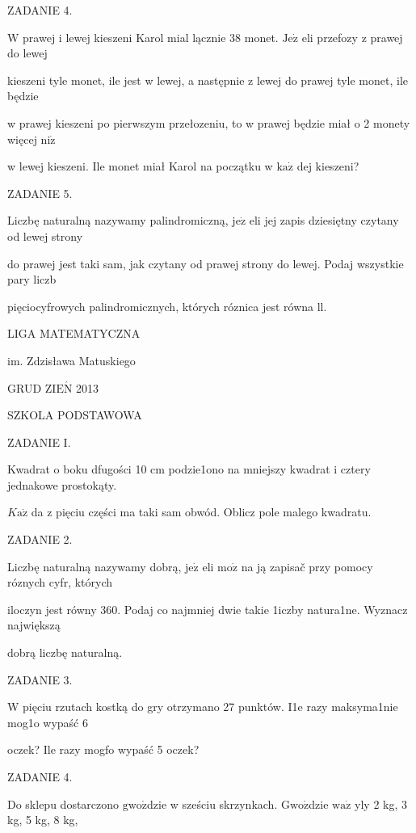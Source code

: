 \documentclass[a4paper,12pt]{article}
\begin{document}
ZADANIE 4.

$\mathrm{W}$ prawej i lewej kieszeni Karol mial lącznie 38 monet. $\mathrm{J}\mathrm{e}\dot{\mathrm{z}}$ eli przefozy z prawej do lewej

kieszeni tyle monet, ile jest w lewej, a następnie z lewej do prawej tyle monet, ile będzie

w prawej kieszeni po pierwszym przełozeniu, to w prawej będzie miał o 2 monety więcej $\mathrm{n}\mathrm{i}\dot{\mathrm{z}}$

w lewej kieszeni. Ile monet miał Karol na początku w $\mathrm{k}\mathrm{a}\dot{\mathrm{z}}$ dej kieszeni?

ZADANIE 5.

Liczbę naturalną nazywamy palindromiczną, $\mathrm{j}\mathrm{e}\dot{\mathrm{z}}$ eli jej zapis dziesiętny czytany od lewej strony

do prawej jest taki sam, jak czytany od prawej strony do lewej. Podaj wszystkie pary liczb

pięciocyfrowych palindromicznych, których róznica jest równa ll.






LIGA MATEMATYCZNA

im. Zdzisława Matuskiego

GRUD Z$\mathrm{I}\mathrm{E}\acute{\mathrm{N}}$ 2013

SZKOLA PODSTAWOWA

ZADANIE I.

Kwadrat o boku dfugości 10 cm podzie1ono na mniejszy kwadrat i cztery jednakowe prostokąty.

$K\mathrm{a}\dot{\mathrm{z}}$ da z pięciu części ma taki sam obwód. Oblicz pole malego kwadratu.

ZADANIE 2.

Liczbę naturalną nazywamy dobrą, $\mathrm{j}\mathrm{e}\dot{\mathrm{z}}$ eli $\mathrm{m}\mathrm{o}\dot{\mathrm{z}}$ na ją zapisač przy pomocy róznych cyfr, których

iloczyn jest równy 360. Podaj co najmniej dwie takie 1iczby natura1ne. Wyznacz największą

dobrą liczbę naturalną.

ZADANIE 3.

W pięciu rzutach kostką do gry otrzymano 27 punktów. I1e razy maksyma1nie mog1o wypaść 6

oczek? Ile razy mogfo wypaść 5 oczek?

ZADANIE 4.

Do sklepu dostarczono $\mathrm{g}\mathrm{w}\mathrm{o}\acute{\mathrm{z}}$dzie w sześciu skrzynkach. $\mathrm{G}\mathrm{w}\mathrm{o}\acute{\mathrm{z}}$dzie $\mathrm{w}\mathrm{a}\dot{\mathrm{z}}$ yly 2 kg, 3 kg, 5 kg, 8 kg,
\end{document}
